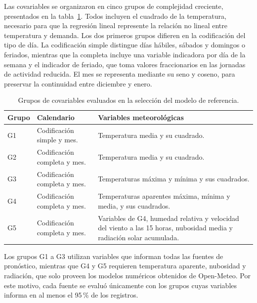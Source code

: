 Las covariables se organizaron en cinco grupos de complejidad creciente, presentados en la tabla~\ref{tab:grupos_features}. Todos incluyen el cuadrado de la temperatura, necesario para que la regresión lineal represente la relación no lineal entre temperatura y demanda. Los dos primeros grupos difieren en la codificación del tipo de día. La codificación simple distingue días hábiles, sábados y domingos o feriados, mientras que la completa incluye una variable indicadora por día de la semana y el indicador de feriado, que toma valores fraccionarios en las jornadas de actividad reducida. El mes se representa mediante su seno y coseno, para preservar la continuidad entre diciembre y enero.

\begin{table}[htbp]
	\centering
	\caption{Grupos de covariables evaluados en la selección del modelo de referencia.}
	\label{tab:grupos_features}
	\footnotesize
	\setlength{\tabcolsep}{4pt}
	\renewcommand{\arraystretch}{1.15}
	\begin{tabularx}{\textwidth}{
			@{}
			>{\raggedright\arraybackslash\hsize=0.4\hsize}X
			>{\raggedright\arraybackslash\hsize=1.0\hsize}X
			>{\raggedright\arraybackslash\hsize=1.6\hsize}X
			@{}
		}
		\toprule
		\textbf{Grupo} & \textbf{Calendario} & \textbf{Variables meteorológicas} \\
		\midrule
		G1 & Codificación simple y mes. & Temperatura media y su cuadrado. \\
		G2 & Codificación completa y mes. & Temperatura media y su cuadrado. \\
		G3 & Codificación completa y mes. & Temperaturas máxima y mínima y sus cuadrados. \\
		G4 & Codificación completa y mes. & Temperaturas aparentes máxima, mínima y media, y sus cuadrados. \\
		G5 & Codificación completa y mes. & Variables de G4, humedad relativa y velocidad del viento a las 15 horas, nubosidad media y radiación solar acumulada. \\
		\bottomrule
	\end{tabularx}
\end{table}

Los grupos G1 a G3 utilizan variables que informan todas las fuentes de pronóstico, mientras que G4 y G5 requieren temperatura aparente, nubosidad y radiación, que solo proveen los modelos numéricos obtenidos de Open-Meteo. Por este motivo, cada fuente se evaluó únicamente con los grupos cuyas variables informa en al menos el 95\,\% de los registros.

